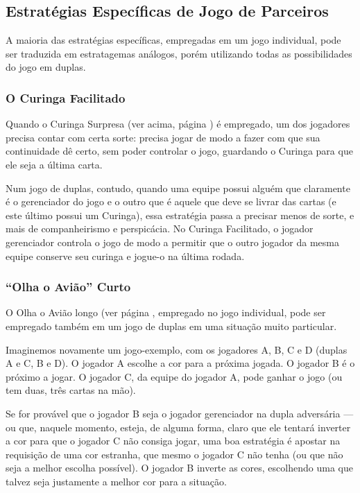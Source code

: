 \subsection{Estratégias Específicas de Jogo de Parceiros}

A maioria das estratégias específicas, empregadas em um jogo individual, pode ser traduzida em estratagemas análogos, porém utilizando todas as possibilidades do jogo em duplas.

\subsubsection{O Curinga Facilitado}

Quando o Curinga Surpresa (ver acima, página \pageref{curingasurpresa}) é empregado, um dos jogadores precisa contar com certa sorte: precisa jogar de modo a fazer com que sua continuidade dê certo, sem poder controlar o jogo, guardando o Curinga para que ele seja a última carta.

Num jogo de duplas, contudo, quando uma equipe possui alguém que claramente é o gerenciador do jogo e o outro que é aquele que deve se livrar das cartas (e este último possui um Curinga), essa estratégia passa a precisar menos de sorte, e mais de companheirismo e perspicácia. No Curinga Facilitado, o jogador gerenciador controla o jogo de modo a permitir que o outro jogador da mesma equipe conserve seu curinga e jogue-o na última rodada. 

\subsubsection{``Olha o Avião'' Curto}

\label{aviaocurto}

O Olha o Avião longo (ver página \pageref{aviaolongo}, empregado no jogo individual, pode ser empregado também em um jogo de duplas em uma situação muito particular.

Imaginemos novamente um jogo-exemplo, com os jogadores A, B, C e D (duplas A e C, B e D). O jogador A escolhe a cor para a próxima jogada. O jogador B é o próximo a jogar. O jogador C, da equipe do jogador A, pode ganhar o jogo (ou tem duas, três cartas na mão).

Se for provável que o jogador B seja o jogador gerenciador na dupla adversária --- ou que, naquele momento, esteja, de alguma forma, claro que ele tentará inverter a cor para que o jogador C não consiga jogar, uma boa estratégia é apostar na requisição de uma cor estranha, que mesmo o jogador C não tenha (ou que não seja a melhor escolha possível). O jogador B inverte as cores, escolhendo uma que talvez seja justamente a melhor cor para a situação.

